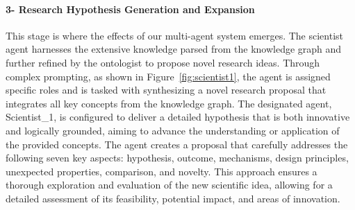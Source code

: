 \documentclass{article}
\begin{document}
\paragraph{3- Research Hypothesis Generation and Expansion} This stage is where the effects of our multi-agent system emerges. The scientist agent harnesses the extensive knowledge parsed from the knowledge graph and further refined by the ontologist to propose novel research ideas. Through complex prompting, as shown in Figure~\ref{fig:scientist1}, the agent is assigned specific roles and is tasked with synthesizing a novel research proposal that integrates all key concepts from the knowledge graph. The designated agent, Scientist\_1, is configured to deliver a detailed hypothesis that is both innovative and logically grounded, aiming to advance the understanding or application of the provided concepts. The agent creates a proposal that carefully addresses the following seven key aspects: hypothesis, outcome, mechanisms, design principles, unexpected properties, comparison, and novelty. This approach ensures a thorough exploration and evaluation of the new scientific idea, allowing for a detailed assessment of its feasibility, potential impact, and areas of innovation.
\end{document}

